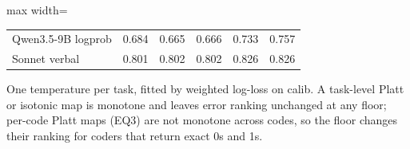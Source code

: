\begin{table}[t]
\begin{adjustbox}{max width=\linewidth}
\begin{tabular}{lrrrrr}
Qwen3.5-9B logprob & 0.684 & 0.665 & 0.666 & 0.733 & 0.757 \\
Sonnet verbal & 0.801 & 0.802 & 0.802 & 0.826 & 0.826 \\
\bottomrule
\end{tabular}
\end{adjustbox}
\par\smallskip\footnotesize\raggedright One temperature per task, fitted by weighted log-loss on calib. A task-level Platt or isotonic map is monotone and leaves error ranking unchanged at any floor; per-code Platt maps (EQ3) are not monotone across codes, so the floor changes their ranking for coders that return exact 0s and 1s.
\end{table}
